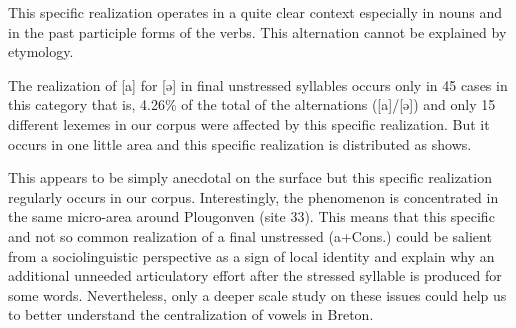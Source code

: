 \documentclass[output=paper]{LSP/langsci}
\begin{document}
\newpage
This specific realization operates in a quite clear context especially in nouns and in the past participle forms of the verbs. This alternation cannot be explained by etymology. 

The realization of [a] for [ə] in final unstressed syllables occurs only in 45 cases in this category that is, 4.26\% of the total of the alternations ([a]/[ə]) and only 15 different lexemes in our corpus were affected by this specific realization. But it occurs in one little area and this specific realization is distributed as  shows.

\begin{table}
\label{tab:7}
\caption{Distribution of the different occurrences of (a+Cons.) according to the location investigated}
\end{table}

This appears to be simply anecdotal on the surface but this specific realization regularly occurs in our corpus. Interestingly, the phenomenon is concentrated in the same micro-area around Plougonven (site 33). This means that this specific and not so common realization of a final unstressed (a+Cons.) could be salient from a sociolinguistic perspective as a sign of local identity and explain why an additional unneeded articulatory effort after the stressed syllable is produced for some words. Nevertheless, only a deeper scale study on these issues could help us to better understand the centralization of vowels in Breton.
\end{document}

